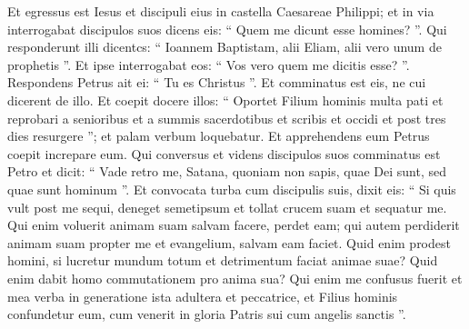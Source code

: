 \begin{biblechapter}
\begin{biblechapter}
\begin{biblechapter}
\begin{biblechapter}
\begin{biblechapter}
\begin{biblechapter}
\begin{biblechapter}
\begin{biblechapter}
 \verse Et egressus est Iesus et discipuli eius in castella Caesareae Philippi; et in via interrogabat discipulos suos dicens eis: “ Quem me dicunt esse homines? ”. 
 \verse Qui responderunt illi dicentcs: “ Ioannem Baptistam, alii Eliam, alii vero unum de prophetis ”. 
\verse Et ipse interrogabat eos: “ Vos vero quem me dicitis esse? ”. Respondens Petrus ait ei: “ Tu es Christus ”. 
\verse Et comminatus est eis, ne cui dicerent de illo.
 \verse Et coepit docere illos: “ Oportet Filium hominis multa pati et reprobari a senioribus et a summis sacerdotibus et scribis et occidi et post tres dies resurgere ”; 
\verse et palam verbum loquebatur. Et apprehendens eum Petrus coepit increpare eum. 
\verse Qui conversus et videns discipulos suos comminatus est Petro et dicit: “ Vade retro me, Satana, quoniam non sapis, quae Dei sunt, sed quae sunt hominum ”.
 \verse Et convocata turba cum discipulis suis, dixit eis: “ Si quis vult post me sequi, deneget semetipsum et tollat crucem suam et sequatur me. 
\verse Qui enim voluerit animam suam salvam facere, perdet eam; qui autem perdiderit animam suam propter me et evangelium, salvam eam faciet. 
\verse Quid enim prodest homini, si lucretur mundum totum et detrimentum faciat animae suae? 
\verse Quid enim dabit homo commutationem pro anima sua? 
\verse Qui enim me confusus fuerit et mea verba in generatione ista adultera et peccatrice, et Filius hominis confundetur eum, cum venerit in gloria Patris sui cum angelis sanctis ”.
 

\end{biblechapter}
\end{biblechapter}
\end{biblechapter}
\end{biblechapter}
\end{biblechapter}
\end{biblechapter}
\end{biblechapter}
\end{biblechapter}
